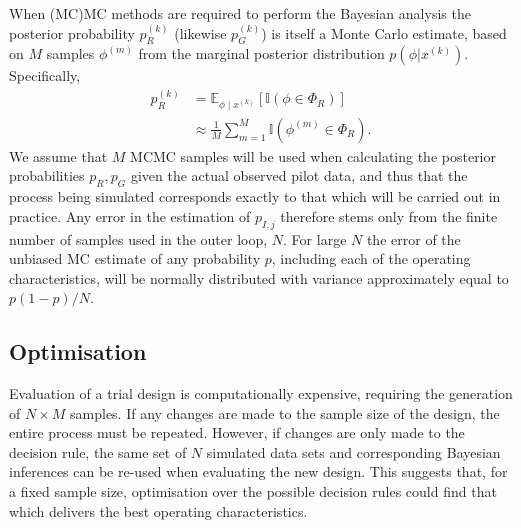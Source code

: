 \documentclass{article} %
\begin{document}
When (MC)MC methods are required to perform the Bayesian analysis the posterior probability $p_{R}^{(k)}$ (likewise $p_{G}^{(k)}$) is itself a Monte Carlo estimate, based on $M$ samples $\phi^{(m)}$ from the marginal posterior distribution $p(\phi | x^{(k)})$. Specifically,
\begin{align}
p_{R}^{(k)} &= \mathbb{E}_{\phi \mid x^{(k)}} [ \mathbb{I}(\phi \in \Phi_{R}) ] \\
 & \approx \frac{1}{M} \sum_{m=1}^{M} \mathbb{I}(\phi^{(m)} \in \Phi_{R}).
\end{align}
We assume that $M$ MCMC samples will be used when calculating the posterior probabilities $p_{R}, p_{G}$ given the actual observed pilot data, and thus that the process being simulated corresponds exactly to that which will be carried out in practice. Any error in the estimation of $p_{I,j}$ therefore stems only from the finite number of samples used in the outer loop, $N$. For large $N$ the error of the unbiased MC estimate of any probability $p$, including each of the operating characteristics, will be normally distributed with variance approximately equal to $p(1-p)/N$.


\subsection{Optimisation}\label{sec:optimisation}

Evaluation of a trial design is computationally expensive, requiring the generation of $N \times M$ samples. If any changes are made to the sample size of the design, the entire process must be repeated. However, if changes are only made to the decision rule, the same set of $N$ simulated data sets and corresponding Bayesian inferences can be re-used when evaluating the new design. This suggests that, for a fixed sample size, optimisation over the possible decision rules could find that which delivers the best operating characteristics.
\end{document}
